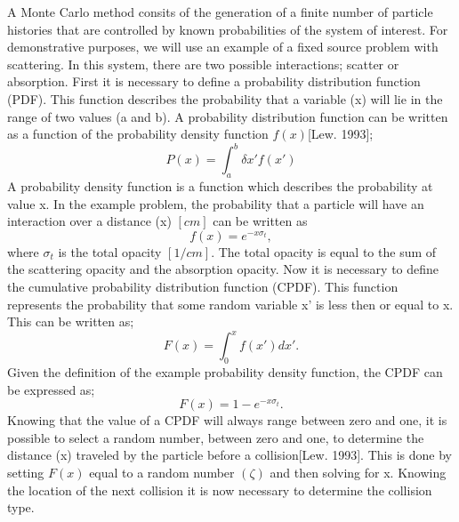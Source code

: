 \noindent
	\indent A Monte Carlo method consits of the generation of a finite number of particle histories that are controlled by known probabilities of the system of interest. For demonstrative purposes, we will use an example of a fixed source problem with scattering. In this system, there are two possible interactions; scatter or absorption. First it is necessary to define a probability distribution function (PDF). This function describes the probability that a variable (x) will lie in the range of two values (a and b). A probability distribution function can be written as a function of the probability density function $f(x)$[Lew. 1993];
	\begin{equation}
	 P(x)=\int_a^b\delta x' f(x')
	\end{equation}
	A probability density function is a function which describes the probability at value x. In the example problem, the probability that a particle will have an interaction over a distance (x) $[cm]$ can be written as
	\begin{equation}
	 f(x)=e^{-x{\sigma_t}},
	\end{equation}
	where $\sigma_t$ is the total opacity $[1/cm]$. The total opacity is equal to the sum of the scattering opacity and the absorption opacity. Now it is necessary to define the cumulative probability distribution function (CPDF). This function represents the probability that some random variable x' is less then or equal to x. This can be written as;
	\begin{equation}
	 F(x)=\int_0^xf(x')dx'.
	\end{equation}
 	Given the definition of the example probability density function, the CPDF can be expressed as;
	\begin{equation}
	 F(x)=1-e^{{-x{\sigma_t}}}.
	\end{equation}
	Knowing that the value of a CPDF will always range between zero and one, it is possible to select a random number, between zero and one, to determine the distance (x) traveled by the particle before a collision[Lew. 1993]. This is done by setting $F(x)$ equal to a random number $(\zeta)$ and then solving for x. Knowing the location of the next collision it is now necessary to determine the collision type.


